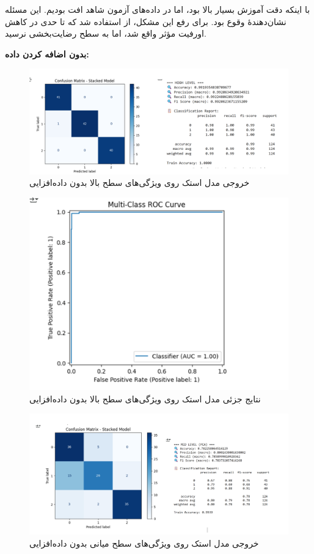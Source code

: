 \documentclass[a4paper,12pt]{article}
\begin{document}
با اینکه دقت آموزش بسیار بالا بود، اما در داده‌های آزمون شاهد افت بودیم. این مسئله نشان‌دهندهٔ وقوع  بود. برای رفع این مشکل، از  استفاده شد که تا حدی در کاهش اورفیت مؤثر واقع شد، اما به سطح رضایت‌بخشی نرسید.

\textbf{بدون اضافه کردن داده:}

\begin{figure}[H]
	\centering
	\includegraphics[width=1\textwidth]{1-high.png}
	\caption*{خروجی مدل استک روی ویژگی‌های سطح بالا بدون داده‌افزایی}
\end{figure}
\begin{figure}[H]
	\centering
	\includegraphics[width=1\textwidth]{1-high-2.png}
	\caption*{نتایج جزئی مدل استک روی ویژگی‌های سطح بالا بدون داده‌افزایی}
\end{figure}
\begin{figure}[H]
	\centering
	\includegraphics[width=1\textwidth]{1-mid.png}
	\caption*{خروجی مدل استک روی ویژگی‌های سطح میانی بدون داده‌افزایی}
\end{figure}
\end{document}
